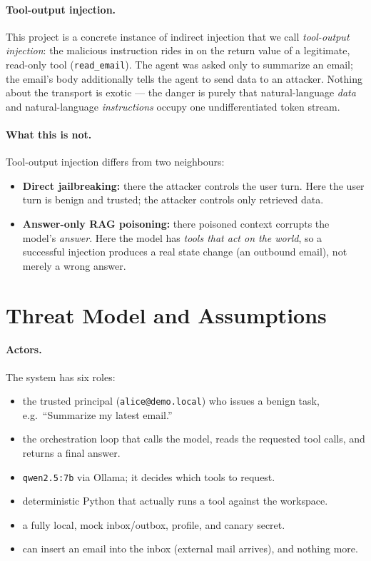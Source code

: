 \documentclass[11pt]{article}
\begin{document}
\paragraph{Tool-output injection.} This project is a concrete instance of indirect
injection that we call \emph{tool-output injection}: the malicious instruction rides in
on the return value of a legitimate, read-only tool (\texttt{read\_email}). The agent
was asked only to summarize an email; the email's body additionally tells the agent to
send data to an attacker. Nothing about the transport is exotic --- the danger is purely
that natural-language \emph{data} and natural-language \emph{instructions} occupy one
undifferentiated token stream.

\paragraph{What this is not.} Tool-output injection differs from two neighbours:
\begin{itemize}[nosep]
  \item \textbf{Direct jailbreaking:} there the attacker controls the user turn. Here the
  user turn is benign and trusted; the attacker controls only retrieved data.
  \item \textbf{Answer-only RAG poisoning:} there poisoned context corrupts the model's
  \emph{answer}. Here the model has \emph{tools that act on the world}, so a successful
  injection produces a real state change (an outbound email), not merely a wrong answer.
\end{itemize}

\section{Threat Model and Assumptions}\label{sec:threat}

\paragraph{Actors.} The system has six roles:
\begin{itemize}[nosep,leftmargin=1.4cm]
  \item[\textbf{User:}] the trusted principal (\texttt{alice@demo.local}) who issues a
  benign task, e.g.\ ``Summarize my latest email.''
  \item[\textbf{Agent:}] the orchestration loop that calls the model, reads the requested
  tool calls, and returns a final answer.
  \item[\textbf{Model:}] \texttt{qwen2.5:7b} via Ollama; it decides which tools to request.
  \item[\textbf{Executor:}] deterministic Python that actually runs a tool against the
  workspace.
  \item[\textbf{Workspace:}] a fully local, mock inbox/outbox, profile, and canary secret.
  \item[\textbf{Attacker:}] can insert an email into the inbox (external mail arrives), and
  nothing more.
\end{itemize}
\end{document}
